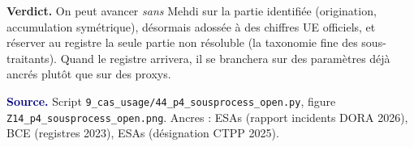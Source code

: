 \documentclass[11pt,a4paper]{article}
\begin{document}
\begin{cle}[colback=orange!8,colframe=orange!70!black]
\textbf{Verdict.} On peut avancer \emph{sans} Mehdi sur la partie identifiée (origination,
accumulation symétrique), désormais adossée à des chiffres UE officiels, et réserver au registre
la seule partie non résoluble (la taxonomie fine des sous-traitants). Quand le registre arrivera,
il se branchera sur des paramètres déjà ancrés plutôt que sur des proxys.
\end{cle}

\smallskip
\noindent\footnotesize\textcolor{navy}{\textbf{Source.}} Script
\texttt{9\_cas\_usage/44\_p4\_sousprocess\_open.py}, figure \texttt{Z14\_p4\_sousprocess\_open.png}.
Ancres : ESAs (rapport incidents DORA 2026), BCE (registres 2023), ESAs (désignation CTPP 2025).
\end{document}
